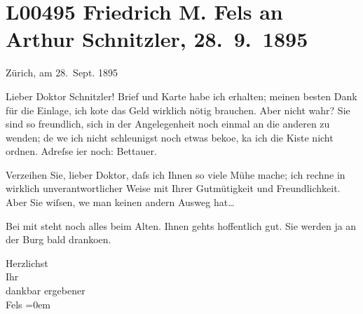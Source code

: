

\section[Friedrich M. Fels an Arthur Schnitzler, 28. 9. 1895]{L00495 Friedrich M. Fels an Arthur Schnitzler, 28. 9. 1895}
\nopagebreak{}
\rehead{ }\normalsize\beginnumbering{}
\toendnotes[C]{\smallbreak\pagebreak[2]}
\toendnotes[C]{\smallbreak}
\pstart
           \raggedleft{}{\pb}Zürich, am 28. Sept. 1895\pend
           
\pstart\center{}Lieber Doktor Schnitzler!\pend\vspace{0.5em}
\pstart
           Brief und Karte habe ich erhalten; meinen besten Dank für die Einlage, ich ko{\geminationn}te das Geld wirklich nötig brauchen. Aber nicht wahr?
               Sie sind so freundlich, sich in der Angelegenheit noch einmal an die anderen zu
               wenden; de{\geminationn} we{\geminationn} ich nicht
                  \introOben{}schleunigst\introOben{} noch etwas beko{\geminationm}e, ka{\geminationn} ich die Kiste nicht ordnen. Adreſse i{\geminationm}er
               noch: Bettauer.\pend
           
\pstart
           Verzeihen Sie, lieber Doktor, daſs ich Ihnen so viele Mühe mache; ich rechne in
               wirklich unverantwortlicher Weise mit Ihrer Gutmütigkeit und Freundlichkeit. Aber Sie
               wiſsen, we{\geminationn} man keinen andern Ausweg hat{\dots}\pend
           
\pstart
           Bei mit steht noch alles beim Alten. Ihnen gehts hoffentlich gut. Sie werden ja an
               der Burg bald dranko{\geminationm}en.\pend
           
\pstart
           Herzlichst{\\[\baselineskip]}Ihr{\\[\baselineskip]}dankbar ergebener{\\[\baselineskip]}\spacefill\mbox{Fels}\pend
           \leftskip=0em{}\endnumbering{}  
      